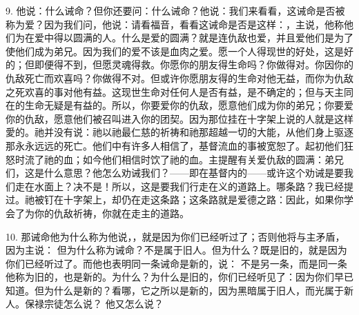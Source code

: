 9. 他说：什么诫命？但你还要问：什么诫命？他说：我们来看看，这诫命是否被称为爱？因为我们问，他说：请看福音，看看这诫命是否是这样：，主说，他称他们为在爱中得以圆满的人。什么是爱的圆满？就是连仇敌也爱，并且爱他们是为了使他们成为弟兄。因为我们的爱不该是血肉之爱。愿一个人得现世的好处，这是好的；但即便得不到，但愿灵魂得救。你愿你的朋友得生命吗？你做得对。你因你的仇敌死亡而欢喜吗？你做得不对。但或许你愿朋友得的生命对他无益，而你为仇敌之死欢喜的事对他有益。这现世生命对任何人是否有益，是不确定的；但与天主同在的生命无疑是有益的。所以，你要爱你的仇敌，愿意他们成为你的弟兄；你要爱你的仇敌，愿意他们被召叫进入你的团契。因为那位挂在十字架上说的人就是这样愛的。祂并没有说：祂以祂最仁慈的祈祷和祂那超越一切的大能，从他们身上驱逐那永永远远的死亡。他们中有许多人相信了，基督流血的事被宽恕了。起初他们狂怒时流了祂的血；如今他们相信时饮了祂的血。主提醒有关爱仇敌的圆满：弟兄们，这是什么意思？他怎么劝诫我们？——即在基督内的——或许这个劝诫是要我们走在水面上？决不是！所以，这是要我们行走在义的道路上。哪条路？我已经提过。祂被钉在十字架上，却仍在走这条路；这条路就是爱德之路：因此，如果你学会了为你的仇敌祈祷，你就在走主的道路。\par

10.  那诫命他为什么称为他说，，就是因为你们已经听过了；否则他将与主矛盾，因为主说： 但为什么称为诫命？不是属于旧人。但为什么？既是旧的，就是因为你们已经听过了。而他也表明同一条诫命是新的，说： 不是另一条，而是同一条他称为旧的，也是新的。为什么？为什么是旧的，你们已经听见了：因为你们早已知道。但为什么是新的？看哪，它之所以是新的，因为黑暗属于旧人，而光属于新人。保禄宗徒怎么说？ 他又怎么说？\par


